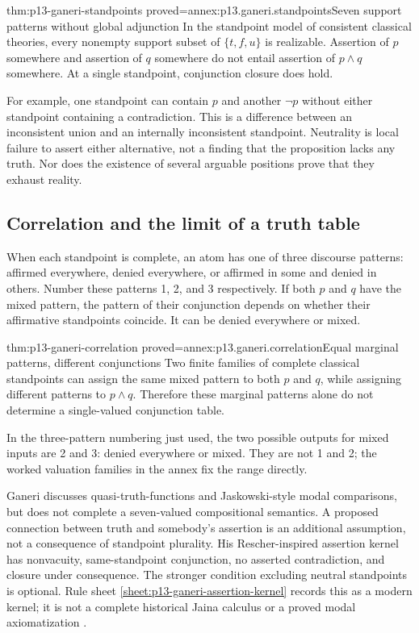 \begin{hblemma}{thm:p13-ganeri-standpoints}
 {proved=annex:p13.ganeri.standpoints}{Seven support patterns without global adjunction}
In the standpoint model of consistent classical theories, every nonempty
support subset of \(\{t,f,u\}\) is realizable. Assertion of \(p\) somewhere
and assertion of \(q\) somewhere do not entail assertion of \(p\land q\)
somewhere. At a single standpoint, conjunction closure does hold.
\end{hblemma}

For example, one standpoint can contain \(p\) and another \(\neg p\)
without either standpoint containing a contradiction. This is a difference
between an inconsistent union and an internally inconsistent standpoint.
Neutrality is local failure to assert either alternative, not a finding
that the proposition lacks any truth. Nor does the existence of several
arguable positions prove that they exhaust reality.

\subsection{Correlation and the limit of a truth table}

When each standpoint is complete, an atom has one of three discourse
patterns: affirmed everywhere, denied everywhere, or affirmed in some
and denied in others. Number these patterns 1, 2, and 3 respectively.
If both \(p\) and \(q\) have the mixed pattern,
the pattern of their conjunction depends on whether their affirmative
standpoints coincide. It can be denied everywhere or mixed.

\begin{hblemma}{thm:p13-ganeri-correlation}
 {proved=annex:p13.ganeri.correlation}{Equal marginal patterns, different conjunctions}
Two finite families of complete classical standpoints can assign the
same mixed pattern to both \(p\) and \(q\), while assigning different
patterns to \(p\land q\). Therefore these marginal patterns alone do not
determine a single-valued conjunction table.
\end{hblemma}

In the three-pattern numbering just used, the two possible outputs for
mixed inputs are 2 and 3: denied everywhere or mixed. They are not
1 and 2; the worked valuation families in the annex fix the range directly.

Ganeri discusses quasi-truth-functions and Jaskowski-style modal comparisons,
but does not complete a seven-valued compositional semantics. A proposed
connection between truth and somebody's assertion is an additional
assumption, not a consequence of standpoint plurality.
His Rescher-inspired assertion kernel has nonvacuity, same-standpoint
conjunction, no asserted contradiction, and closure under consequence.
The stronger condition excluding neutral standpoints is optional.
Rule sheet \ref{sheet:p13-ganeri-assertion-kernel} records this as a modern kernel; it is not a
complete historical Jaina calculus or a proved modal axiomatization
\cite[pp.~363--369]{Ganeri2004IndianLogicPublished}.

